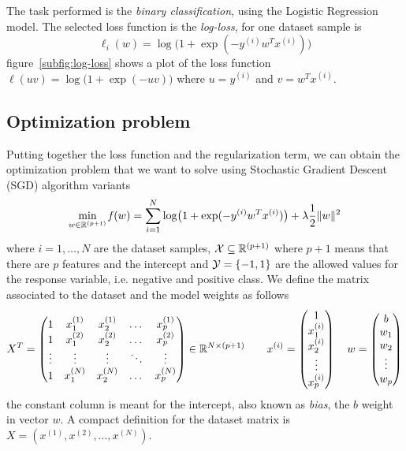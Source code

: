 The task performed is the \emph{binary classification}, using the Logistic Regression model. The selected loss function is the \emph{log-loss}, for one dataset sample is
\begin{equation}\label{eq:sample_loss}
\ell_i(w)=\log\bigl(1+\exp(-y^{(i)}w^Tx^{(i)})\bigr)
\end{equation}
figure~\vref{subfig:log-loss} shows a plot of the loss function $\ell(uv)=\log\bigl(1+\exp(-uv)\bigr)$ where $u=y^{(i)}$ and $v=w^Tx^{(i)}$.

\subsection{Optimization problem}

Putting together the loss function and the regularization term, we can obtain the optimization problem that we want to solve using Stochastic Gradient Descent (SGD) algorithm variants
\begin{equation}\label{eq:opt-prob}
\min_{w\in\mathbb{R}^{(p+1)}}\operatorname*{\mathit{f}}(w)=\sum_{i=1}^N\log\bigl(1+\exp(-y^{(i)}w^Tx^{(i)})\bigr)+\lambda\frac{1}{2}\lVert w\rVert^2
\end{equation}
where $i=1,\dots,N$ are the dataset samples, $\mathcal{X}\subseteq\mathbb{R}^{(p+1)}$ where $p+1$ means that there are $p$ features and the intercept and $\mathcal{Y}=\{-1,1\}$ are the allowed values for the response variable, i.e. negative and positive class. %
We define the matrix associated to the dataset and the model weights as follows
\[
X^T=
\begin{pmatrix}
1 & x_1^{(1)} & x_2^{(1)} & \dots & x_p^{(1)} \\
1 & x_1^{(2)} & x_2^{(2)} & \dots & x_p^{(2)} \\
\vdots & \vdots & \vdots & \ddots & \vdots \\
1 & x_1^{(N)} & x_2^{(N)} & \dots & x_p^{(N)}
\end{pmatrix}\in\mathbb{R}^{N\times(p+1)}\qquad
x^{(i)}=
\begin{pmatrix}
1 \\ x_1^{(i)} \\ x_2^{(i)} \\ \vdots \\ x_p^{(i)}
\end{pmatrix}\quad
w=
\begin{pmatrix}
b \\ w_1 \\ w_2 \\ \vdots \\ w_p
\end{pmatrix}
\]
the constant column is meant for the intercept, also known as \emph{bias}, the $b$ weight in vector $w$. A compact definition for the dataset matrix is $X=(x^{(1)},x^{(2)},\dots,x^{(N)})$.%

